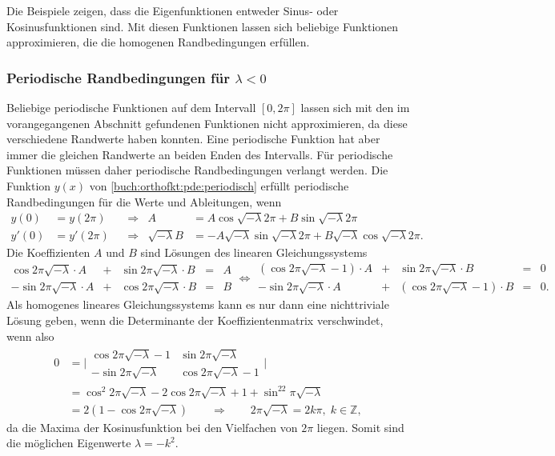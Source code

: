 Die Beispiele zeigen, dass die Eigenfunktionen entweder Sinus-
oder Kosinusfunktionen sind.
Mit diesen Funktionen lassen sich beliebige Funktionen approximieren,
die die homogenen Randbedingungen erfüllen.

%
%
\subsubsection{Periodische Randbedingungen für $\lambda < 0$}
Beliebige periodische Funktionen auf dem Intervall $[0,2\pi]$ lassen sich
mit den im vorangegangenen Abschnitt gefundenen Funktionen nicht
approximieren, da diese verschiedene Randwerte haben konnten.
Eine periodische Funktion hat aber immer die gleichen Randwerte
an beiden Enden des Intervalls.
Für periodische Funktionen müssen daher periodische Randbedingungen
verlangt werden.
Die Funktion $y(x)$ von
\eqref{buch:orthofkt:pde:periodisch}
erfüllt periodische Randbedingungen für die Werte und Ableitungen, wenn
\begin{align*}
y(0) &= y(2\pi) 
&&\Rightarrow&
A &= A\cos\!\sqrt{-\lambda}2\pi + B\sin\!\sqrt{-\lambda}2\pi
\\
y'(0)&=y'(2\pi)
&&\Rightarrow&
\!\sqrt{-\lambda}B
&=
-
A\!\sqrt{-\lambda}\sin\!\sqrt{-\lambda}2\pi
+
B\!\sqrt{-\lambda}\cos\!\sqrt{-\lambda}2\pi.
\end{align*}
Die Koeffizienten $A$ und $B$ sind Lösungen des linearen Gleichungssystems
\[
\renewcommand{\arraycolsep}{2pt}
\begin{array}{rcrcr}
\cos2\pi\!\sqrt{-\lambda} \cdot A
&+&
\sin2\pi\!\sqrt{-\lambda} \cdot B
&=& A
\\
-\sin2\pi\!\sqrt{-\lambda} \cdot A
&+&
\cos2\pi\!\sqrt{-\lambda} \cdot B
&=& B
\end{array}
\Leftrightarrow
\begin{array}{rcrcl}
(\cos2\pi\!\sqrt{-\lambda}-1) \cdot A
&+&
\sin2\pi\!\sqrt{-\lambda} \cdot B
&=&
0
\\
-\sin2\pi\!\sqrt{-\lambda} \cdot A
&+&
(\cos2\pi\!\sqrt{-\lambda}-1) \cdot B
&=& 0.
\end{array}
\]
Als homogenes lineares Gleichungssystems kann es nur dann eine nichttriviale
Lösung geben, wenn die Determinante der Koeffizientenmatrix verschwindet,
wenn also
\begin{align*}
0
&=
\biggl|\begin{matrix}
\cos 2\pi\!\sqrt{-\lambda}-1 & \sin 2\pi\!\sqrt{-\lambda}   \\
-\sin 2\pi\!\sqrt{-\lambda}  & \cos 2\pi\!\sqrt{-\lambda}-1
\end{matrix}\biggr|
\\
&=
\cos^2 2\pi\!\sqrt{-\lambda} -2\cos2\pi\!\sqrt{-\lambda}+1
+
\sin^22\pi\!\sqrt{-\lambda}
\\
&=
2(1-\cos2\pi\!\sqrt{-\lambda})
\qquad\Rightarrow\qquad
2\pi\!\sqrt{-\lambda} = 2k\pi,\;k\in\mathbb{Z},
\end{align*}
da die Maxima der Kosinusfunktion bei den Vielfachen von $2\pi$ liegen.
Somit sind die möglichen Eigenwerte $\lambda=-k^2$.

